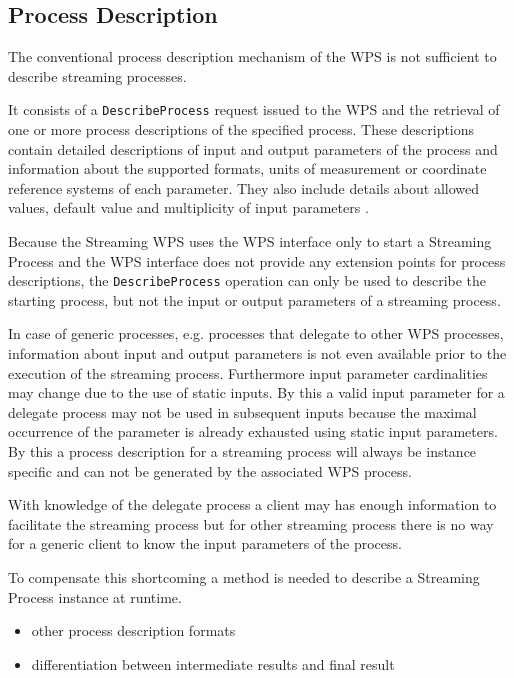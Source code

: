 	\subsection{Process Description}
		\label{sec:stream:processdescription}
		The conventional process description mechanism of the \ac{WPS} is not sufficient to describe streaming processes.

		It consists of a \texttt{DescribeProcess} request issued to the \ac{WPS} and the retrieval of one or more process descriptions of the specified process. These descriptions contain detailed descriptions of input and output parameters of the process and information about the supported formats, units of measurement or coordinate reference systems of each parameter. They also include details about allowed values, default value and multiplicity of input parameters \citep{ogc:wps}.

		Because the Streaming \ac{WPS} uses the \ac{WPS} interface only to start a Streaming Process and the \ac{WPS} interface does not provide any extension points for process descriptions, the \texttt{DescribeProcess} operation can only be used to describe the starting process, but not the input or output parameters of a streaming process.

		In case of generic processes, e.g. processes that delegate to other \ac{WPS} processes, information about input and output parameters is not even available prior to the execution of the streaming process. Furthermore input parameter cardinalities may change due to the use of static inputs. By this a valid input parameter for a delegate process may not be used in subsequent inputs because the maximal occurrence of the parameter is already exhausted using static input parameters. By this a process description for a streaming process will always be instance specific and can not be generated by the associated \ac{WPS} process.

		With knowledge of the delegate process a client may has enough information to facilitate the streaming process but for other streaming process there is no way for a generic client to know the input parameters of the process.

		To compensate this shortcoming a method is needed to describe a Streaming Process instance at runtime.
		\begin{itemize}
			\item other process description formats
			\item differentiation between intermediate results and final result
		\end{itemize}
